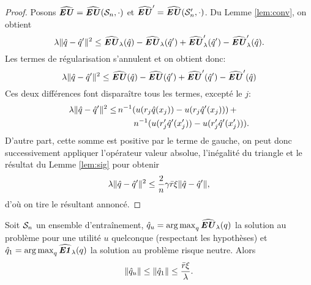 \begin{proof}
  Posons $\hEU = \hEU(\S_n,\cdot)$ et $\hEU' = \hEU(\S_n',\cdot)$. Du Lemme \ref{lem:conv}, on
  obtient
  \begin{equation}
    \lambda\|\qh - \qh'\|^2 \leq \hEU_\lambda(\qh) - \hEU_\lambda(\qh') + \hEU'_\lambda(\qh') - \hEU'_\lambda(\qh).
  \end{equation}
  Les termes de régularisation s'annulent et on obtient donc:
  \begin{equation}
    \lambda\|\qh - \qh'\|^2 \leq \hEU(\qh) - \hEU(\qh') + \hEU'(\qh') - \hEU'(\qh)
  \end{equation}
  Ces deux différences font disparaître tous les termes, excepté le
  $j$\ieme:
  \begin{align}
    \lambda\|\qh - \qh'\|^2 \leq &\,n^{-1}(u(r_j\qh(x_j)) - u(r_j\qh'(x_j)))\, + \\
                        & \qquad n^{-1}(u(r_j'\qh'(x_j')) - u(r_j'\qh'(x_j'))).
  \end{align}
  D'autre part, cette somme est positive par le terme de gauche, on peut donc
  successivement appliquer l'opérateur valeur absolue, l'inégalité du triangle et
  le résultat du Lemme \ref{lem:sig} pour obtenir
  \begin{equation}
    \lambda\|\qh - \qh'\|^2 \leq \frac{2}{n}\gamma\rmax\xi\|\qh - \qh'\|,
  \end{equation}
  d'où on tire le résultant annoncé.
\end{proof}

\begin{lemme}
  \label{lem:dl}
  Soit $\S_n$ un ensemble d'entraînement, $\qh_u = \argmax_q\hEU_\lambda(q)$ la solution au
  problème pour une utilité $u$ quelconque (respectant les hypothèses) et
  $\qh_1 = \argmax_q\hEN_\lambda(q)$ la solution au problème risque neutre. Alors
  \begin{equation}
    \|\qh_u\| \leq \|\qh_1\| \leq \frac{\rmax\xi}{\lambda}.
  \end{equation}
\end{lemme}

